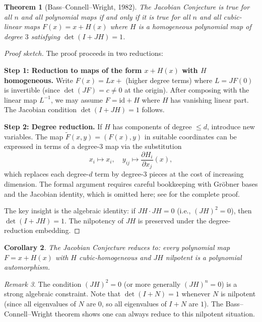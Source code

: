 \documentclass[12pt,a4paper]{amsart}
\newtheorem{theorem}{Theorem}[section]
\newtheorem{corollary}[theorem]{Corollary}
\theoremstyle{definition}
\theoremstyle{remark}
\newtheorem{remark}[theorem]{Remark}
\begin{document}
\begin{theorem}[Bass--Connell--Wright, 1982]\label{thm:BCW}
The Jacobian Conjecture is true for all $n$ and all polynomial maps if and only if
it is true for all $n$ and all cubic-linear maps $F(x) = x + H(x)$ where
$H$ is a homogeneous polynomial map of degree $3$ satisfying
$\det(I + JH) = 1$.
\end{theorem}

\begin{proof}[Proof sketch]
The proof proceeds in two reductions:

\textbf{Step 1: Reduction to maps of the form $x + H(x)$ with $H$ homogeneous.}
Write $F(x) = Lx + $ (higher degree terms) where $L = JF(0)$ is invertible
(since $\det(JF) = c \neq 0$ at the origin). After composing with the linear
map $L^{-1}$, we may assume $F = \mathrm{id} + H$ where $H$ has vanishing linear
part. The Jacobian condition $\det(I + JH) = 1$ follows.

\textbf{Step 2: Degree reduction.}
If $H$ has components of degree $\leq d$, introduce new variables. The map
$\tilde{F}(x, y) = (F(x), y)$ in suitable coordinates can be expressed in terms
of a degree-$3$ map via the substitution
\[
  x_i \mapsto x_i,\quad y_{ij} \mapsto \frac{\partial H_i}{\partial x_j}(x),
\]
which replaces each degree-$d$ term by degree-$3$ pieces at the cost of
increasing dimension. The formal argument requires careful bookkeeping with
Gröbner bases and the Jacobian identity, which is omitted here; see \cite{BCW82}
for the complete proof.

The key insight is the algebraic identity: if $JH \cdot JH = 0$ (i.e., $(JH)^2 = 0$),
then $\det(I + JH) = 1$. The nilpotency of $JH$ is preserved under the
degree-reduction embedding.
\end{proof}

\begin{corollary}\label{cor:nilpotent}
The Jacobian Conjecture reduces to: every polynomial map $F = x + H(x)$
with $H$ cubic-homogeneous and $JH$ nilpotent is a polynomial automorphism.
\end{corollary}

\begin{remark}
The condition $(JH)^2 = 0$ (or more generally $(JH)^n = 0$) is a strong algebraic
constraint. Note that $\det(I + N) = 1$ whenever $N$ is nilpotent (since all
eigenvalues of $N$ are $0$, so all eigenvalues of $I + N$ are $1$). The
Bass--Connell--Wright theorem shows one can always reduce to this nilpotent situation.
\end{remark}
\end{document}
